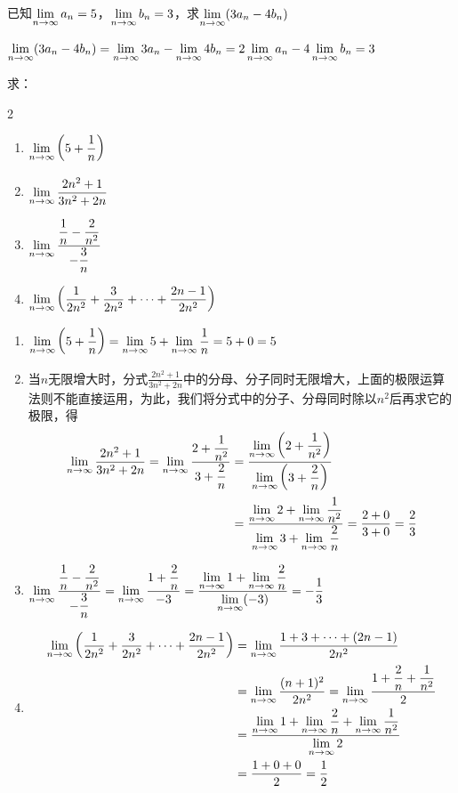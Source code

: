 \begin{example}
已知$ \lim\limits_{n\to \infty} a_n=5$，$ \lim\limits_{n\to \infty} b_n=3$，求$ \lim\limits_{n\to \infty} (3a_n-4b_n)$
\end{example}

\begin{solution}
$ \lim\limits_{n\to \infty} (3a_n-4b_n)= \lim\limits_{n\to \infty} 3a_n- \lim\limits_{n\to \infty} 4b_n=2 \lim\limits_{n\to \infty} a_n-4 \lim\limits_{n\to \infty} b_n=3$
\end{solution}

\begin{example}
求：
\begin{multicols}{2}
\begin{enumerate}[(1)]
    \item $ \lim\limits_{n\to \infty} \left(5+\dfrac{1}{n}\right)  $
    \item $ \lim\limits_{n\to \infty} \dfrac{2n^2+1}{3n^2+2n}  $
    \item $ \lim\limits_{n\to \infty} \dfrac{\dfrac{1}{n}-\dfrac{2}{n^2}}{-\dfrac{3}{n}}  $
    \item $ \lim\limits_{n\to \infty} \left(\dfrac{1}{2n^2}+\dfrac{3}{2n^2}+\cdots +\dfrac{2n-1}{2n^2}\right)  $
\end{enumerate}
\end{multicols}
\end{example}

\begin{solution}
\begin{enumerate}[(1)]
    \item $\lim\limits_{n\to \infty} \left(5+\dfrac{1}{n}\right) =\lim\limits_{n\to \infty} 5+\lim\limits_{n\to \infty} \dfrac{1}{n}=5+0=5 $
\item 当$n$无限增大时，分式$\frac{2n^2+1}{3n^2+2n}$中的分母、分子同时无限增大，上面的极限运算法则不能直接运用，为此，我们将分式中的分子、分母同时除以$n^2$后再求它的极限，得
\[\begin{split}
    \lim\limits_{n\to \infty} \dfrac{2n^2+1}{3n^2+2n}  =\lim\limits_{n\to \infty} \dfrac{2+\dfrac{1}{n^2}}{3+\dfrac{2}{n}}&=\dfrac{\lim\limits_{n\to \infty} \left(2+\dfrac{1}{n^2}\right)}{\lim\limits_{n\to \infty} \left(3+\dfrac{2}{n}\right)} \\
    &=\dfrac{\lim\limits_{n\to \infty} 2+\lim\limits_{n\to \infty} \dfrac{1}{n^2}}{\lim\limits_{n\to \infty} 3+\lim\limits_{n\to \infty} \dfrac{2}{n}}=\dfrac{2+0}{3+0}=\dfrac{2}{3} 
\end{split}\]
\item $ \lim\limits_{n\to \infty} \dfrac{\dfrac{1}{n}-\dfrac{2}{n^2}}{-\dfrac{3}{n}}= \lim\limits_{n\to \infty} \dfrac{1+\dfrac{2}{n}}{-3}=\dfrac{ \lim\limits_{n\to \infty} 1+ \lim\limits_{n\to \infty} \dfrac{2}{n}}{ \lim\limits_{n\to \infty} (-3)}=-\dfrac{1}{3}$
\item \[\begin{split}
    \lim\limits_{n\to \infty}  \left(\dfrac{1}{2n^2}+\dfrac{3}{2n^2}+\cdots +\dfrac{2n-1}{2n^2}\right) &= \lim\limits_{n\to \infty} \dfrac{1+3+\cdots+(2n-1)}{2n^2}\\
    &= \lim\limits_{n\to \infty} \dfrac{(n+1)^2}{2n^2}= \lim\limits_{n\to \infty} \dfrac{1+\dfrac{2}{n}+\dfrac{1}{n^2}}{2}\\
    &=\dfrac{ \lim\limits_{n\to \infty} 1+ \lim\limits_{n\to \infty} \dfrac{2}{n}+ \lim\limits_{n\to \infty} \dfrac{1}{n^2}}{ \lim\limits_{n\to \infty} 2}\\
    &=\dfrac{1+0+0}{2}=\dfrac{1}{2}
\end{split}\]
\end{enumerate}    
\end{solution}


